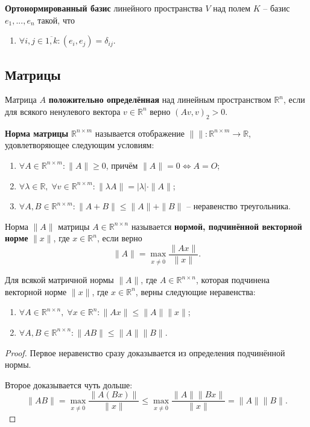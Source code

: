 \documentclass{article}
\begin{document}
\begin{define}
	\textbf{Ортонормированный базис} линейного пространства $V$ над полем
	$K$ -- базис $e_1,...,e_n$ такой, что
	\begin{enumerate}[nosep]
		\item $\forall i,j\in\overline{1,k}: (e_i,e_j)=\delta_{ij}$.
	\end{enumerate}
\end{define}

\subsection{Матрицы}
\begin{define}
	Матрица $A$ \textbf{положительно определённая} над линейным
	пространством $\mathbb R^n$, если для всякого ненулевого вектора
	$v\in \mathbb R^n$ верно $(Av, v)_2>0$.
\end{define}

\begin{define}
	\textbf{Норма матрицы} $\mathbb R^{n\times m}$
	называется отображение $\|\|: \mathbb R^{n\times m}\rightarrow
	\mathbb R$, удовлетворяющее следующим условиям:
	\begin{enumerate}[nosep]
		\item $\forall A\in\mathbb R^{n\times m}: \|A\|\ge 0$, причём
			$\|A\|=0\Leftrightarrow A=O$;
		\item $\forall \lambda\in \mathbb R,\;\forall v\in
			\mathbb R^{n\times m}:
			\|\lambda A\|=|\lambda|\cdot\|A\|$;
		\item $\forall A,B\in\mathbb R^{n\times m}: \|A+B\|\le\|A\|+\|B\|$ --
			неравенство треугольника.
	\end{enumerate}
\end{define}

\begin{define}
	Норма $\|A\|$ матрицы $A\in \mathbb R^{n\times n}$ называется
	\textbf{нормой, подчинённой векторной норме} $\|x\|$, где $x\in \mathbb
	R^n$, если верно
	\[\|A\|=\max_{x\ne \overline{0}}\frac{\|Ax\|}{\|x\|}.\]
\end{define}

\begin{lemma}
	Для всякой матричной нормы $\|A\|$, где $A\in\mathbb R^{n\times n}$,
	которая подчинена векторной норме $\|x\|$, где $x\in\mathbb R^n$, верны
	следующие неравенства:
	\begin{enumerate}[nosep]
		\item $\forall A\in\mathbb R^{n\times n},\;\forall x\in\mathbb
			R^n: \|Ax\|\le\|A\|\|x\|$;
		\item $\forall A,B\in\mathbb R^{n\times n}:
			\|AB\|\le\|A\|\|B\|$.
	\end{enumerate}
\end{lemma}

\begin{proof}
	Первое неравенство сразу доказывается из определения подчинённой нормы.

	Второе доказывается чуть дольше:
	\[\|AB\|=\max_{x\ne\overline{0}}\frac{\|A(Bx)\|}{\|x\|}\le
	\max_{x\ne\overline{0}}\frac{\|A\|\|Bx\|}{\|x\|}=\|A\|\|B\|.\]
\end{proof}
\end{document}
